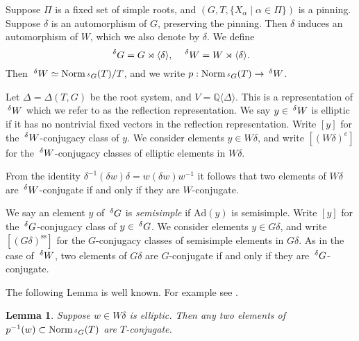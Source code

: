 \documentclass[10pt,leqno]{article}
\newtheorem{lemma}[equation]{Lemma}
\newcommand{\qed}{\hfill $\square$ \medskip}
\newenvironment{proof}[1][Proof]{\noindent\textbf{#1.} }{\qed}
\newcommand{\Ad}{\text{Ad}}
\newcommand{\Norm}{\text{Norm}}
\newcommand{\Q}{\mathbb Q}
\newcommand\inv{^{-1}}
\renewcommand{\ss}{\text{ss}}
\newcommand{\Wext}{\negthinspace\negthinspace\phantom{a}^\delta W}
\newcommand{\Gext}{\negthinspace\negthinspace\phantom{a}^\delta G}
\begin{document}
Suppose $\Pi$ is a fixed set of simple roots, and
$(G,T,\{X_\alpha\mid\alpha\in\Pi\})$ is a pinning.
Suppose $\delta$ is an automorphism of $G$, preserving
the pinning.
Then $\delta$ induces an
automorphism of $W$, which we also denote by $\delta$. We define
$$
\Gext=G \rtimes\langle\delta\rangle, \quad \Wext=W\rtimes\langle\delta\rangle.
$$
Then $\Wext\simeq \Norm_{\Gext}(T)/T$, and we write $p:\Norm_{\Gext}(T)\rightarrow \Wext$.

Let $\Delta=\Delta(T,G)$ be the root system, and
$V=\Q\langle\Delta\rangle$. This is a representation of $\Wext$ which
we refer to as the reflection representation.  We say $y\in\Wext$ is
elliptic if it has no nontrivial fixed vectors in the reflection
representation.  Write $[y]$ for the $\Wext$-conjugacy class of
$y$. We consider elements $y\in W\delta$, and write $[(W\delta)^e]$
for the $\Wext$-conjugacy classes of elliptic elements in $W\delta$.

From the identity $\delta\inv(\delta w)\delta=w(\delta w)w\inv$ it
follows that two elements of $W\delta$ are $\Wext$-conjugate if and
only if they are $W$-conjugate.

We say an element $y$ of $\Gext$ is {\it semisimple} if $\Ad(y)$ is
semisimple.  Write $[y]$ for the $\Gext$-conjugacy class of
$y\in \Gext$. We consider elements $y\in G\delta$, and write
$[(G\delta)^{\ss}]$ for the $G$-conjugacy classes of semisimple
elements in $G\delta$.  As in the case of $\Wext$, two elements of
$G\delta$ are $G$-conjugate if and only if they are $\Gext$-conjugate.

The following Lemma is well known. For example see \cite[Remark 4.1.1]{debacker_reeder}.

\begin{lemma}
\label{l:conjugate}
Suppose $w\in W\delta$ is elliptic.
Then any two
elements of $p\inv(w)\subset\Norm_{\Gext}(T)$ are $T$-conjugate.
\end{lemma}

\begin{comment}
\begin{proof}
Suppose $g\in p\inv(w)\subset \Norm_G(T)\delta$. 
Then for $t\in T$
$$
tgt\inv=tw(t\inv)g.
$$
Since $w$ is elliptic the map $t\rightarrow tw(t\inv)$ has finite
kernel, so is surjective.

Now suppose $g_1,g_2\in p\inv(w)$.
Since $w\in W\delta$, $g_1,g_2\in G\delta$. Write $g_1=h_1\delta,g_2=h_2\delta$ with $h_1,h_2\in G$.
By the previous discussion choose $t$ so that $tw(t\inv)=h_2h_1\inv$. Then $tg_1t\inv=g_2$.
\end{proof}
\end{comment}
\end{document}

